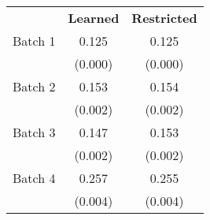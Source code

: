 
\begin{tabular}[t]{lcc}
 & \textbf{Learned}& \textbf{Restricted} \\ 
 \cmidrule(lr){2-2} \cmidrule(lr){3-3}
Batch 1 & \num{0.125} & \num{0.125}\\
 & (\num{0.000}) & (\num{0.000})\\
Batch 2 & \num{0.153} & \num{0.154}\\
 & (\num{0.002}) & (\num{0.002})\\
Batch 3 & \num{0.147} & \num{0.153}\\
 & (\num{0.002}) & (\num{0.002})\\
Batch 4 & \num{0.257} & \num{0.255}\\
 & (\num{0.004}) & (\num{0.004})\\
\bottomrule
\end{tabular}
